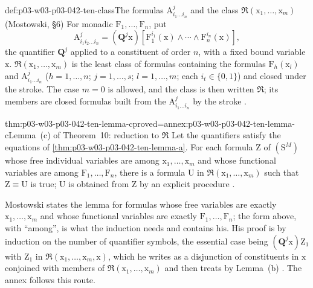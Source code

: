\begin{hbdefinition}{def:p03-w03-p03-042-ten-class}{The formulas \(\mathrm A^j_{i_1\ldots i_n}\) and the class \(\mathfrak R(\mathrm x_1,\ldots,\mathrm x_m)\) (Mostowski, \S6)}
For monadic \(\mathrm F_1,\ldots,\mathrm F_n\), put
\[
 \mathrm A^j_{i_1i_2\ldots i_n}=(\mathbf Q^j\mathrm x)[\mathrm
 F_1^{i_1}(\mathrm x)\wedge\cdots\wedge\mathrm F_n^{i_n}(\mathrm x)],
\]
the quantifier \(\mathbf Q^j\) applied to a constituent of order \(n\),
with a fixed bound variable \(\mathrm x\).  \(\mathfrak R(\mathrm
x_1,\ldots,\mathrm x_m)\) is the least class of formulas containing the
formulas \(\mathrm F_h(\mathrm x_l)\) and \(\mathrm A^j_{i_1\ldots i_n}\)
(\(h=1,\ldots,n\); \(j=1,\ldots,s\); \(l=1,\ldots,m\); each
\(i_t\in\{0,1\}\)) and closed under the stroke.  The case \(m=0\) is
allowed, and the class is then written \(\mathfrak R\); its members are
closed formulas built from the \(\mathrm A^j_{i_1\ldots i_n}\) by the
stroke \cite[p.~30]{Mostowski1957}.
\end{hbdefinition}

\begin{hblemma}{thm:p03-w03-p03-042-ten-lemma-c}{proved=annex:p03-w03-p03-042-ten-lemma-c}{Lemma~(c) of Theorem~10: reduction to \(\mathfrak R\)}
Let the quantifiers satisfy the equations of
\cref{thm:p03-w03-p03-042-ten-lemma-a}.  For each formula \(\mathrm Z\)
of \((\mathrm S^M)\) whose free individual variables are among \(\mathrm
x_1,\ldots,\mathrm x_m\) and whose functional variables are among
\(\mathrm F_1,\ldots,\mathrm F_n\), there is a formula \(\mathrm U\) in
\(\mathfrak R(\mathrm x_1,\ldots,\mathrm x_m)\) such that \(\mathrm
Z\equiv\mathrm U\) is true; \(\mathrm U\) is obtained from \(\mathrm Z\)
by an explicit procedure \cite[p.~30]{Mostowski1957}.
\end{hblemma}

Mostowski states the lemma for formulas whose free variables are exactly
\(\mathrm x_1,\ldots,\mathrm x_m\) and whose functional variables are
exactly \(\mathrm F_1,\ldots,\mathrm F_n\); the form above, with
``among'', is what the induction needs and contains his.  His proof is by
induction on the number of quantifier symbols, the essential case being
\((\mathbf Q^j\mathrm x)\mathrm Z_1\) with \(\mathrm Z_1\) in
\(\mathfrak R(\mathrm x_1,\ldots,\mathrm x_m,\mathrm x)\), which he
writes as a disjunction of constituents in \(\mathrm x\) conjoined with
members of \(\mathfrak R(\mathrm x_1,\ldots,\mathrm x_m)\) and then
treats by Lemma~(b) \cite[p.~30]{Mostowski1957}.  The annex follows this
route.

